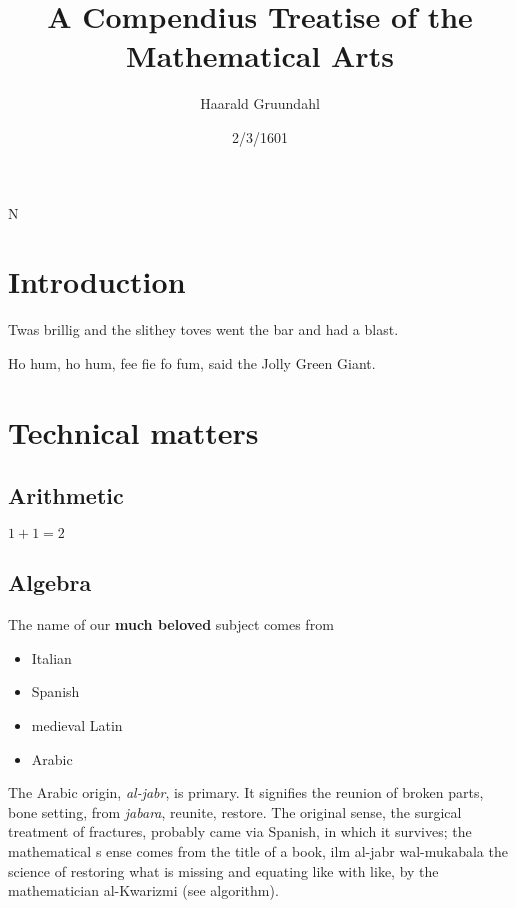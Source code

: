 \documentclass[11pt]{amsart}
\title{A Compendius Treatise of the Mathematical Arts}
\author{Haarald Gruundahl}
\date{2/3/1601}
\begin{document}
\maketitle

\parskip8pt
\parindent0pt




N
\section{Introduction}

Twas brillig and the slithey toves
went the bar and had a blast.


Ho hum, ho hum, fee fie fo fum,
said the Jolly Green Giant.




\section{Technical matters}

\subsection{Arithmetic}

$1 + 1 = 2$




\subsection{Algebra}

The name of our \textbf{much beloved} subject
comes from


\begin{itemize}

\item Italian

\item Spanish

\item medieval Latin

\item Arabic

\end{itemize}


The Arabic origin, \emph{al-jabr}, is primary.
It signifies the reunion of broken parts, bone setting,
from \emph{jabara}, reunite, restore. The original sense,
the surgical treatment of fractures, probably came
via Spanish, in which it survives; the mathematical s
ense comes from the title of a book,
ilm al-jabr wal-mukabala the science of
restoring what is missing and equating like with
like, by the mathematician al-Kwarizmi (see algorithm).
\end{document}
